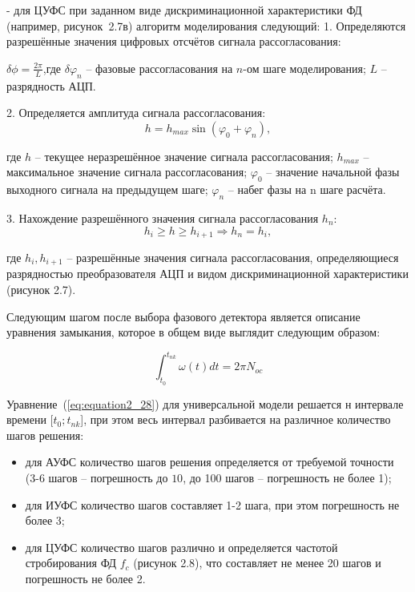 - для ЦУФС при заданном виде дискриминационной характеристики ФД (например, рисунок~2.7в) алгоритм моделирования следующий:
1. Определяются разрешённые значения цифровых отсчётов сигнала рассогласования:\par
$\delta\phi=\frac{2\pi}{L}$,где $\delta\varphi_n$ – фазовые рассогласования на $n$-ом шаге моделирования; $L$ – разрядность АЦП.\par
2. Определяется амплитуда сигнала рассогласования:
\begin{equation}
\label{eq:equation2_26}
  h=h_{max}\sin(\varphi_0+\varphi_n),
\end{equation}\par
\noindent где $h$ – текущее неразрешённое значение сигнала рассогласования; $h_{max}$ – максимальное значение сигнала рассогласования; $\varphi_0$ – значение начальной фазы выходного сигнала на предыдущем шаге; $\varphi_n$ – набег фазы на n шаге расчёта.\par
3. Нахождение разрешённого значения сигнала рассогласования $h_n$:
\begin{equation}
\label{eq:equation2_27}
  h_i\geq h\geq h_{i+1} \Rightarrow h_n = h_i,
\end{equation}\par
\noindent где $h_i, h_{i+1}$ – разрешённые значения сигнала рассогласования, определяющиеся разрядностью преобразователя АЦП и видом дискриминационной характеристики (рисунок 2.7).\par
Следующим шагом после выбора фазового детектора является описание уравнения замыкания, которое в общем виде выглядит следующим образом:\par
\begin{equation}
\label{eq:equation2_28}
  \int^{t_{nk}}_{t_0}\omega(t)dt = 2\pi N_{oc}
\end{equation}\par
Уравнение~(\ref{eq:equation2_28}) для универсальной модели решается н интервале времени [$t_0;t_{nk}$], при этом весь интервал разбивается на различное количество шагов решения:\par
\begin{itemize}
\item для АУФС количество шагов решения определяется от требуемой точности (3-6 шагов – погрешность до $10$, до 100 шагов – погрешность не более 1);
\item для ИУФС количество шагов составляет 1-2 шага, при этом погрешность не более 3;
\item для ЦУФС количество шагов различно и определяется частотой стробирования ФД $f_c$ (рисунок 2.8), что составляет не менее 20 шагов и погрешность не более 2.
\end{itemize}\par
